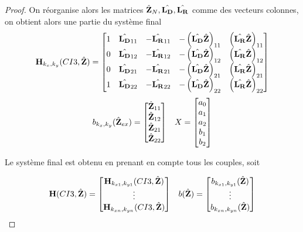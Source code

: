 \begin{proof}
  On réorganise alors les matrices \(\hat{\mathbf{Z}}_N,\hat{\mathbf{L_D}},\hat{\mathbf{L_R}}\) comme des vecteurs colonnes, on obtient alors une partie du système final
  \begin{align}
      \mathbf{H}_{k_{x},k_{y}}(CI3,\hat{\mathbf{Z}}) = \begin{bmatrix}
      1 & \hat{\mathbf{L_D}}_{11} & -\hat{\mathbf{L_R}}_{11} & -\left(\hat{\mathbf{L_D}}\hat{\mathbf{Z}}\right)_{11} & \left(\hat{\mathbf{L_R}}\hat{\mathbf{Z}}\right)_{11}
      \\
      0 & \hat{\mathbf{L_D}}_{12} & -\hat{\mathbf{L_R}}_{12} & -\left(\hat{\mathbf{L_D}}\hat{\mathbf{Z}}\right)_{12} & \left(\hat{\mathbf{L_R}}\hat{\mathbf{Z}}\right)_{12}
      \\
      0 & \hat{\mathbf{L_D}}_{21} & -\hat{\mathbf{L_R}}_{21} & -\left(\hat{\mathbf{L_D}}\hat{\mathbf{Z}}\right)_{21} & \left(\hat{\mathbf{L_R}}\hat{\mathbf{Z}}\right)_{21}
      \\
      1 & \hat{\mathbf{L_D}}_{22} & -\hat{\mathbf{L_R}}_{22} & -\left(\hat{\mathbf{L_D}}\hat{\mathbf{Z}}\right)_{22} & \left(\hat{\mathbf{L_R}}\hat{\mathbf{Z}}\right)_{22}
      \end{bmatrix}
  \end{align}
  \begin{align}
      b_{k_{x},k_{y}}(\hat{\mathbf{Z}}_{ex}) = \begin{bmatrix}
      \hat{\mathbf{Z}}_{11}
      \\
      \hat{\mathbf{Z}}_{12}
      \\
      \hat{\mathbf{Z}}_{21}
      \\
      \hat{\mathbf{Z}}_{22}
      \end{bmatrix} && X = \begin{bmatrix} a_0 \\ a_1 \\ a_2 \\ b_1 \\ b_2 \end{bmatrix}
  \end{align}

  Le système final est obtenu en prenant en compte tous les couples, soit

  \begin{align}
      \mathbf{H}(CI3,\hat{\mathbf{Z}}) = 
      \begin{bmatrix}
        \mathbf{H}_{k_{x1},k_{y1}}(CI3,\hat{\mathbf{Z}})
        \\
        \vdots
        \\
        \mathbf{H}_{k_{xn},k_{yn}}(CI3,\hat{\mathbf{Z}})
      \end{bmatrix}
      &&  b(\hat{\mathbf{Z}}) = 
      \begin{bmatrix}
        b_{k_{x1},k_{y1}}(\hat{\mathbf{Z}})
        \\
        \vdots
        \\
        b_{k_{xn},k_{yn}}(\hat{\mathbf{Z}})
      \end{bmatrix}
  \end{align}


\end{proof}
